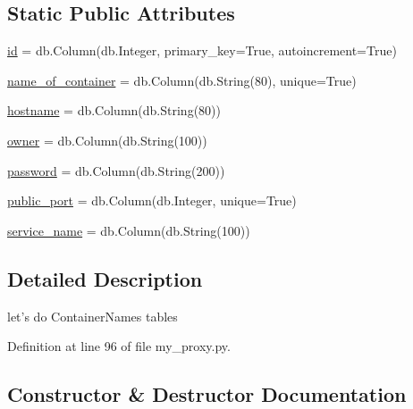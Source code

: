 \subsection*{Static Public Attributes}
\begin{DoxyCompactItemize}
\item 
\hyperlink{classdocker-proxy_1_1my__proxy_1_1_container_names_a7013f7adde5d40aedd4169afb3be1978}{id} = db.\+Column(db.\+Integer, primary\+\_\+key=True, autoincrement=True)
\item 
\hyperlink{classdocker-proxy_1_1my__proxy_1_1_container_names_a5223d4e116bb162d327af3fbdf406c62}{name\+\_\+of\+\_\+container} = db.\+Column(db.\+String(80), unique=True)
\item 
\hyperlink{classdocker-proxy_1_1my__proxy_1_1_container_names_aacca73fd2984a6225ff6f82fb681a508}{hostname} = db.\+Column(db.\+String(80))
\item 
\hyperlink{classdocker-proxy_1_1my__proxy_1_1_container_names_a18b80021fc434e7dac00f009f7a451b5}{owner} = db.\+Column(db.\+String(100))
\item 
\hyperlink{classdocker-proxy_1_1my__proxy_1_1_container_names_a5728904cb244540aa3421e07dc14cc84}{password} = db.\+Column(db.\+String(200))
\item 
\hyperlink{classdocker-proxy_1_1my__proxy_1_1_container_names_accfbd6e258c7ede9ac75360c54086e2a}{public\+\_\+port} = db.\+Column(db.\+Integer, unique=True)
\item 
\hyperlink{classdocker-proxy_1_1my__proxy_1_1_container_names_ac067fae0674728a7064586300ef6b107}{service\+\_\+name} = db.\+Column(db.\+String(100))
\end{DoxyCompactItemize}


\subsection{Detailed Description}
\begin{DoxyVerb}let's do ContainerNames tables
\end{DoxyVerb}
 

Definition at line 96 of file my\+\_\+proxy.\+py.



\subsection{Constructor \& Destructor Documentation}
\hypertarget{classdocker-proxy_1_1my__proxy_1_1_container_names_a6f793b87c5c96d4c3c8becfbc748ada9}{}\label{classdocker-proxy_1_1my__proxy_1_1_container_names_a6f793b87c5c96d4c3c8becfbc748ada9} 
